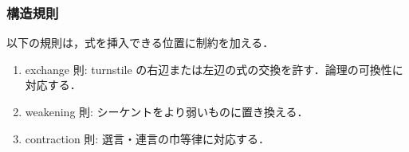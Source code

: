 \documentclass[a4paper,10pt,platex, dvipdfmx]{jsarticle}
\begin{document}
\subsubsection{構造規則}
以下の規則は，式を挿入できる位置に制約を加える．
\begin{enumerate}
\item exchange 則: turnstile の右辺または左辺の式の交換を許す．論理の可換性に対応する．
\begin{figure}[H]
    \begin{minipage}[b]{0.45\linewidth}
        \begin{prooftree}
            \end{prooftree}
    \end{minipage}
    \begin{minipage}[b]{0.45\linewidth}
        \begin{prooftree}
            \end{prooftree}
    \end{minipage}
\end{figure}
\item weakening 則: シーケントをより弱いものに置き換える．\begin{figure}[H]
\begin{minipage}[b]{0.45\columnwidth}
    \begin{prooftree}
    \end{prooftree}
\end{minipage}
\begin{minipage}[b]{0.45\columnwidth}
    \begin{prooftree}
    \end{prooftree}
\end{minipage}
\begin{minipage}[b]{0.45\columnwidth}
\end{minipage}
\end{figure}
\item contraction 則: 選言・連言の巾等律に対応する．

\end{enumerate}
\end{document}

